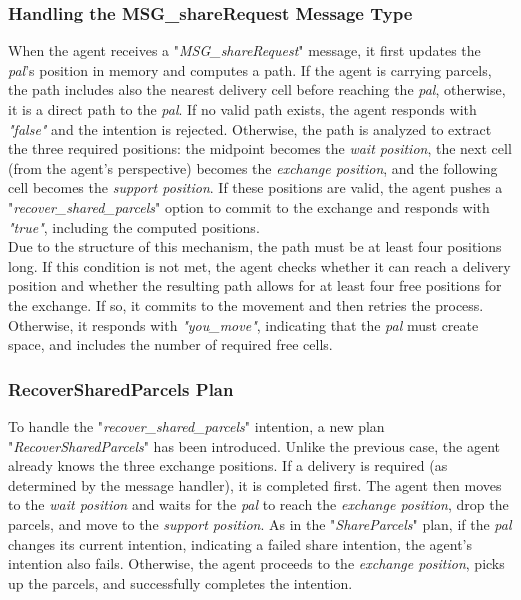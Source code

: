        
        \subsubsection{Handling the MSG\_shareRequest Message Type}
            When the agent receives a "\textit{MSG\_shareRequest}" message, it first updates the \textit{pal}'s position in memory and computes a path. If the agent is carrying parcels, the path includes also the nearest delivery cell before reaching the \textit{pal}, otherwise, it is a direct path to the \textit{pal}. If no valid path exists, the agent responds with \textit{"false"} and the intention is rejected. Otherwise, the path is analyzed to extract the three required positions: the midpoint becomes the \textit{wait position}, the next cell (from the agent's perspective) becomes the \textit{exchange position}, and the following cell becomes the \textit{support position}. If these positions are valid, the agent pushes a "\textit{recover\_shared\_parcels}" option to commit to the exchange and responds with \textit{"true"}, including the computed positions.
            \medskip\\
            Due to the structure of this mechanism, the path must be at least four positions long. If this condition is not met, the agent checks whether it can reach a delivery position and whether the resulting path allows for at least four free positions for the exchange. If so, it commits to the movement and then retries the process. Otherwise, it responds with \textit{"you\_move"}, indicating that the \textit{pal} must create space, and includes the number of required free cells.
            
        \subsubsection{RecoverSharedParcels Plan}
            To handle the "\textit{recover\_shared\_parcels}" intention, a new plan "\textit{RecoverSharedParcels}" has been introduced. Unlike the previous case, the agent already knows the three exchange positions. If a delivery is required (as determined by the message handler), it is completed first. The agent then moves to the \textit{wait position} and waits for the \textit{pal} to reach the \textit{exchange position}, drop the parcels, and move to the \textit{support position}. As in the "\textit{ShareParcels}" plan, if the \textit{pal} changes its current intention, indicating a failed share intention, the agent's intention also fails. Otherwise, the agent proceeds to the \textit{exchange position}, picks up the parcels, and successfully completes the intention.


